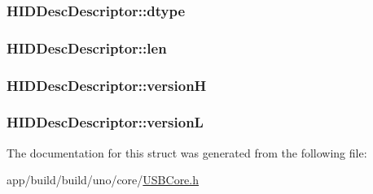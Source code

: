 \hypertarget{struct_h_i_d_desc_descriptor_a343e501ab9f5fdb8f2611a162e7cd5c4}{
\subsubsection[{dtype}]{ H\-I\-D\-Desc\-Descriptor\-::dtype}}\label{struct_h_i_d_desc_descriptor_a343e501ab9f5fdb8f2611a162e7cd5c4}
\hypertarget{struct_h_i_d_desc_descriptor_aebc75efc46076b736c1ea39f35532212}{
\subsubsection[{len}]{ H\-I\-D\-Desc\-Descriptor\-::len}}\label{struct_h_i_d_desc_descriptor_aebc75efc46076b736c1ea39f35532212}
\hypertarget{struct_h_i_d_desc_descriptor_ae23dba8efd0ec7b1af50eb5bc3fe56d8}{
\subsubsection[{version\-H}]{ H\-I\-D\-Desc\-Descriptor\-::version\-H}}\label{struct_h_i_d_desc_descriptor_ae23dba8efd0ec7b1af50eb5bc3fe56d8}
\hypertarget{struct_h_i_d_desc_descriptor_a37aa9612612dbfd0e3340fc0ad6d59d2}{
\subsubsection[{version\-L}]{ H\-I\-D\-Desc\-Descriptor\-::version\-L}}\label{struct_h_i_d_desc_descriptor_a37aa9612612dbfd0e3340fc0ad6d59d2}


The documentation for this struct was generated from the following file\-:\begin{DoxyCompactItemize}
\item 
app/build/build/uno/core/\hyperlink{_u_s_b_core_8h}{U\-S\-B\-Core.\-h}\end{DoxyCompactItemize}
